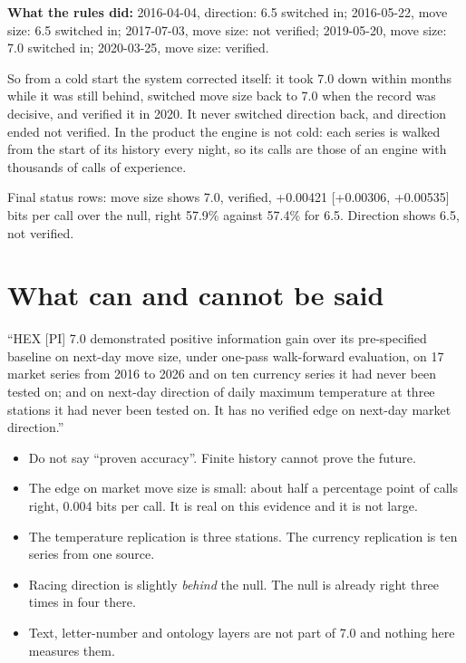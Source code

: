 \documentclass[10.5pt]{article}
\begin{document}
\textbf{What the rules did:} 2016-04-04, direction: 6.5 switched in; 2016-05-22, move size: 6.5 switched in; 2017-07-03, move size: not verified; 2019-05-20, move size: 7.0 switched in; 2020-03-25, move size: verified.

So from a cold start the system corrected itself: it took 7.0 down within months while it was still behind, switched move size back to 7.0 when the record was decisive, and verified it in 2020. It never switched direction back, and direction ended not verified. In the product the engine is not cold: each series is walked from the start of its history every night, so its calls are those of an engine with thousands of calls of experience.

Final status rows: move size shows 7.0, verified, +0.00421 [+0.00306, +0.00535] bits per call over the null, right 57.9\% against 57.4\% for 6.5. Direction shows 6.5, not verified.

\section{What can and cannot be said}
\begin{plain}
``HEX [PI] 7.0 demonstrated positive information gain over its pre-specified baseline on next-day move size, under one-pass walk-forward evaluation, on 17 market series from 2016 to 2026 and on ten currency series it had never been tested on; and on next-day direction of daily maximum temperature at three stations it had never been tested on. It has no verified edge on next-day market direction.''
\end{plain}
\begin{itemize}[leftmargin=1.2em,itemsep=1pt]
\item Do not say ``proven accuracy''. Finite history cannot prove the future.
\item The edge on market move size is small: about half a percentage point of calls right, 0.004 bits per call. It is real on this evidence and it is not large.
\item The temperature replication is three stations. The currency replication is ten series from one source.
\item Racing direction is slightly \emph{behind} the null. The null is already right three times in four there.
\item Text, letter-number and ontology layers are not part of 7.0 and nothing here measures them.
\end{itemize}
\end{document}
